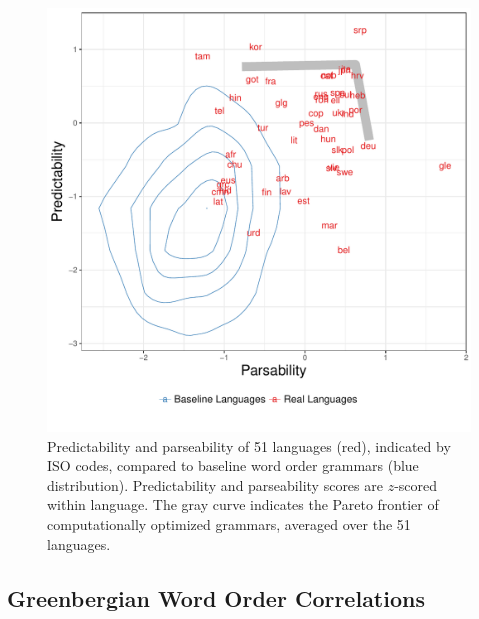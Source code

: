 \documentclass[9pt,twocolumn,twoside,lineno]{pnas-new}
\begin{document}
\begin{figure}
    \centering
    \includegraphics[scale=.45]{../results/plane/pareto-plane-iso-best-balanced-legend-viz-10.pdf}
    \caption{Predictability and parseability of 51 languages (red), indicated by ISO codes, compared to baseline word order grammars (blue distribution). Predictability and parseability scores are $z$-scored within language. The gray curve indicates the Pareto frontier of computationally optimized grammars, averaged over the 51 languages.} %
    \label{fig:pareto-plane}
\end{figure}


\subsection{Greenbergian Word Order Correlations}
\label{sec:greenberg}
\end{document}
